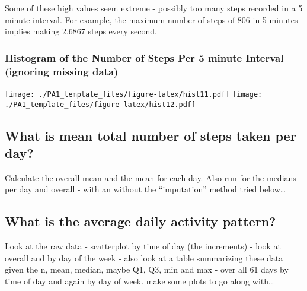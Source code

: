 \documentclass[]{article}
\begin{document}
Some of these high values seem extreme - possibly too many steps
recorded in a 5 minute interval. For example, the maximum number of
steps of 806 in 5 minutes implies making 2.6867 steps every second.

\subsubsection{Histogram of the Number of Steps Per 5 minute Interval
(ignoring missing
data)}\label{histogram-of-the-number-of-steps-per-5-minute-interval-ignoring-missing-data}

\texttt{[image: ./PA1\_template\_files/figure-latex/hist11.pdf]}
\texttt{[image: ./PA1\_template\_files/figure-latex/hist12.pdf]}

\subsection{What is mean total number of steps taken per
day?}\label{what-is-mean-total-number-of-steps-taken-per-day}

Calculate the overall mean and the mean for each day. Also run for the
medians per day and overall - with an without the ``imputation'' method
tried below\ldots{}

\subsection{What is the average daily activity
pattern?}\label{what-is-the-average-daily-activity-pattern}

Look at the raw data - scatterplot by time of day (the increments) -
look at overall and by day of the week - also look at a table
summarizing these data given the n, mean, median, maybe Q1, Q3, min and
max - over all 61 days by time of day and again by day of week. make
some plots to go along with\ldots{}
\end{document}
